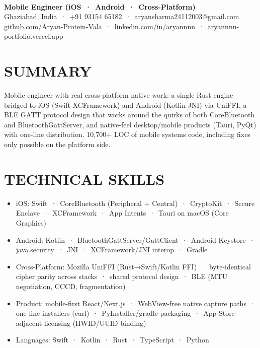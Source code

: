 \documentclass[9pt]{article}
\begin{document}
\\[3pt]
{\large\bfseries Mobile Engineer (iOS \,·\, Android \,·\, Cross-Platform)}\\[3pt]
{\small\color{greyc} Ghaziabad, India \,·\, +91 93154 65182 \,·\, aryansharma24112003@gmail.com}\vspace{-2pt}
{\small\color{greyc} github.com/Aryan-Protein-Vala \,·\, linkedin.com/in/aryannnn \,·\, aryannnn-portfolio.vercel.app}\vspace{-2pt}
\section*{SUMMARY}
Mobile engineer with real cross-platform native work: a single Rust engine bridged to iOS (Swift XCFramework) and Android (Kotlin JNI) via UniFFI, a BLE GATT protocol design that works around the quirks of both CoreBluetooth and BluetoothGattServer, and native-feel desktop/mobile products (Tauri, PyQt) with one-line distribution. 10,700+ LOC of mobile systems code, including fixes only possible on the platform side.
\vspace{1pt}
\section*{TECHNICAL SKILLS}
\begin{itemize}[leftmargin=11pt,itemsep=0pt,topsep=1pt,parsep=0pt]
\item iOS: Swift \,·\, CoreBluetooth (Peripheral + Central) \,·\, CryptoKit \,·\, Secure Enclave \,·\, XCFramework \,·\, App Intents \,·\, Tauri on macOS (Core Graphics)
\item Android: Kotlin \,·\, BluetoothGattServer/GattClient \,·\, Android Keystore \,·\, java.security \,·\, JNI \,·\, XCFramework/JNI interop \,·\, Gradle
\item Cross-Platform: Mozilla UniFFI (Rust→Swift/Kotlin FFI) \,·\, byte-identical cipher parity across stacks \,·\, shared protocol design \,·\, BLE (MTU negotiation, CCCD, fragmentation)
\item Product: mobile-first React/Next.js \,·\, WebView-free native capture paths \,·\, one-line installers (curl) \,·\, PyInstaller/gradle packaging \,·\, App Store–adjacent licensing (HWID/UUID binding)
\item Languages: Swift \,·\, Kotlin \,·\, Rust \,·\, TypeScript \,·\, Python
\end{itemize}
\end{document}
